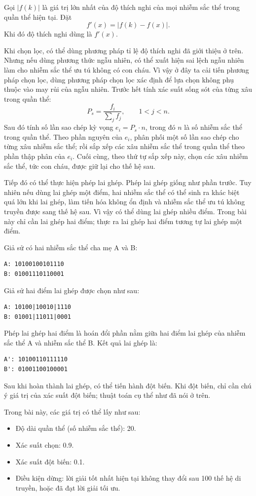 \documentclass[11pt]{article}
\begin{document}
Gọi \(|f(k)|\) là giá trị lớn nhất của độ thích nghi của mọi nhiễm sắc thể
trong quần thể hiện tại. Đặt
\[
  f'(x)=|f(k)-f(x)|.
\]
Khi đó độ thích nghi dùng là \(f'(x)\).

Khi chọn lọc, có thể dùng phương pháp tỉ lệ độ thích nghi đã giới thiệu ở
trên. Nhưng nếu dùng phương thức ngẫu nhiên, có thể xuất hiện sai lệch ngẫu
nhiên làm cho nhiễm sắc thể ưu tú không có con cháu. Vì vậy ở đây ta cải
tiến phương pháp chọn lọc, dùng phương pháp chọn lọc xác định để lựa chọn
không phụ thuộc vào may rủi của ngẫu nhiên. Trước hết tính xác suất sống sót
của từng xâu trong quần thể:
\[
  P_s=\frac{f_i}{\sum_j f_j},\qquad 1<j<n.
\]
Sau đó tính số lần sao chép kỳ vọng \(e_i=P_s\cdot n\), trong đó \(n\) là số
nhiễm sắc thể trong quần thể. Theo phần nguyên của \(e_i\), phân phối một số
lần sao chép cho từng xâu nhiễm sắc thể; rồi sắp xếp các xâu nhiễm sắc thể
trong quần thể theo phần thập phân của \(e_i\). Cuối cùng, theo thứ tự sắp
xếp này, chọn các xâu nhiễm sắc thể, tức con cháu, được giữ lại cho thế hệ
sau.

Tiếp đó có thể thực hiện phép lai ghép. Phép lai ghép giống như phần trước.
Tuy nhiên nếu dùng lai ghép một điểm, hai nhiễm sắc thể có thể sinh ra khác
biệt quá lớn khi lai ghép, làm tiến hóa không ổn định và nhiễm sắc thể ưu tú
không truyền được sang thế hệ sau. Vì vậy có thể dùng lai ghép nhiều điểm.
Trong bài này chỉ cần lai ghép hai điểm; thực ra lai ghép hai điểm tương tự
lai ghép một điểm.

Giả sử có hai nhiễm sắc thể cha mẹ A và B:
\begin{verbatim}
A: 10100100101110
B: 01001110110001
\end{verbatim}
Giả sử hai điểm lai ghép được chọn như sau:
\begin{verbatim}
A: 10100|10010|1110
B: 01001|11011|0001
\end{verbatim}
Phép lai ghép hai điểm là hoán đổi phần nằm giữa hai điểm lai ghép của nhiễm
sắc thể A và nhiễm sắc thể B. Kết quả lai ghép là:
\begin{verbatim}
A': 10100110111110
B': 01001100100001
\end{verbatim}

Sau khi hoàn thành lai ghép, có thể tiến hành đột biến. Khi đột biến, chỉ cần
chú ý giá trị của xác suất đột biến; thuật toán cụ thể như đã nói ở trên.

Trong bài này, các giá trị có thể lấy như sau:
\begin{itemize}
  \item Độ dài quần thể (số nhiễm sắc thể): 20.
  \item Xác suất chọn: 0.9.
  \item Xác suất đột biến: 0.1.
  \item Điều kiện dừng: lời giải tốt nhất hiện tại không thay đổi sau 100 thế
  hệ di truyền, hoặc đã đạt lời giải tối ưu.
\end{itemize}
\end{document}
